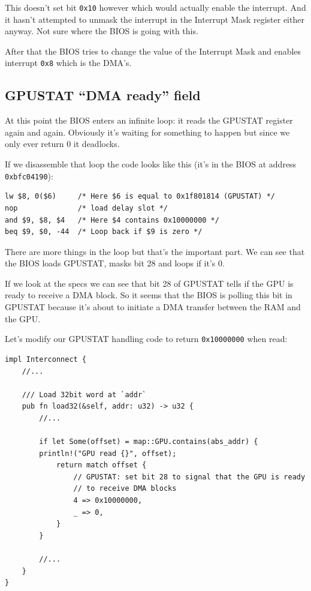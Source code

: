 \documentclass[a4paper]{article}
\newcommand{\code}[1] {\texttt{#1}}
\begin{document}
This doesn't set bit \code{0x10} however which would actually enable
the interrupt. And it hasn't attempted to unmask the interrupt in the
Interrupt Mask register either anyway. Not sure where the BIOS is
going with this.

After that the BIOS tries to change the value of the Interrupt Mask
and enables interrupt \code{0x8} which is the DMA's.

\subsection{GPUSTAT ``DMA ready'' field}

At this point the BIOS enters an infinite loop: it reads the GPUSTAT
register again and again. Obviously it's waiting for something to
happen but since we only ever return 0 it deadlocks.

If we disassemble that loop the code looks like this (it's in the BIOS
at address \code{0xbfc04190}):

\begin{lstlisting}[language=assembly]
lw $8, 0($6)     /* Here $6 is equal to 0x1f801814 (GPUSTAT) */
nop              /* load delay slot */
and $9, $8, $4   /* Here $4 contains 0x10000000 */
beq $9, $0, -44  /* Loop back if $9 is zero */
\end{lstlisting}

There are more things in the loop but that's the important part. We
can see that the BIOS loads GPUSTAT, masks bit 28 and loops if it's 0.

If we look at the specs we can see that bit 28 of GPUSTAT tells if the
GPU is ready to receive a DMA block. So it seems that the BIOS is
polling this bit in GPUSTAT because it's about to initiate a DMA
transfer between the RAM and the GPU.

Let's modify our GPUSTAT handling code to return \code{0x10000000}
when read:

\begin{lstlisting}
impl Interconnect {
    //...

    /// Load 32bit word at `addr`
    pub fn load32(&self, addr: u32) -> u32 {
        //...

        if let Some(offset) = map::GPU.contains(abs_addr) {
	    println!("GPU read {}", offset);
            return match offset {
                // GPUSTAT: set bit 28 to signal that the GPU is ready
                // to receive DMA blocks
                4 => 0x10000000,
                _ => 0,
            }
        }

        //...
    }
}
\end{lstlisting}
\end{document}
